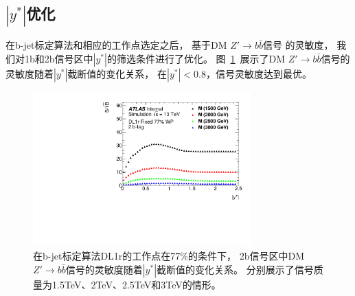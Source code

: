 \subsection{$|y^*|$优化}
\label{sec:DijetBtagging3}

在b-jet标定算法和相应的工作点选定之后，
基于DM $Z\prime\rightarrow b\bar{b}$信号
的灵敏度，
我们对1b和2b信号区中$|y^*|$的筛选条件进行了优化。
图~\ref{fig:Btag_ystar}~展示了DM $Z\prime\rightarrow b\bar{b}$信号的灵敏度随着$|y^*|$截断值的变化关系，
在$|y^*|<0.8$，信号灵敏度达到最优。



\begin{figure}[htbp]
  \centering
  \includegraphics[width=0.75\textwidth]{figuresDijet/03-BenchmarkSignals/Ystar_DMZ_DL1r_Fixed77.pdf}
  \caption{
在b-jet标定算法DL1r的工作点在77\%的条件下，
2b信号区中DM $Z\prime\rightarrow b\bar{b}$信号的灵敏度随着$|y^*|$截断值的变化关系。
分别展示了信号质量为1.5TeV、2TeV、2.5TeV和3TeV的情形。
  }
\label{fig:Btag_ystar}
\end{figure}

